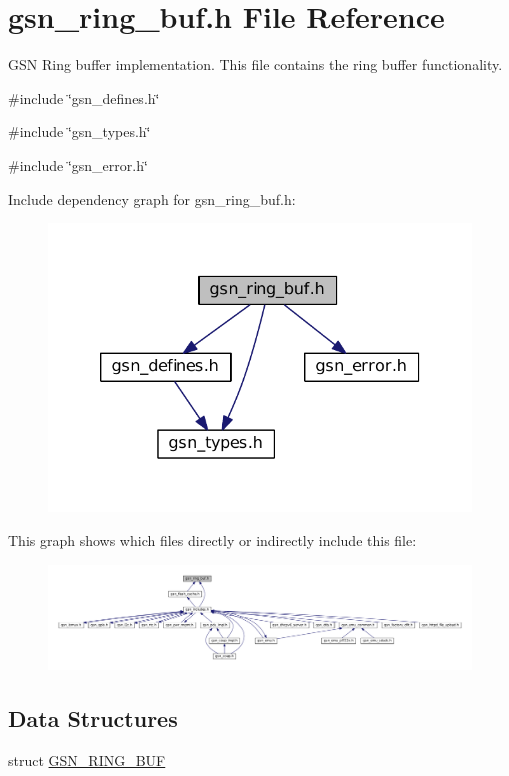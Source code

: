 \hypertarget{a00578}{
\section{gsn\_\-ring\_\-buf.h File Reference}
\label{a00578}
}


GSN Ring buffer implementation. This file contains the ring buffer functionality.  


{\ttfamily \#include \char`\"{}gsn\_\-defines.h\char`\"{}}\par
{\ttfamily \#include \char`\"{}gsn\_\-types.h\char`\"{}}\par
{\ttfamily \#include \char`\"{}gsn\_\-error.h\char`\"{}}\par
Include dependency graph for gsn\_\-ring\_\-buf.h:
\nopagebreak
\begin{figure}[H]
\begin{center}
\leavevmode
\includegraphics[width=320pt]{a00813}
\end{center}
\end{figure}
This graph shows which files directly or indirectly include this file:
\nopagebreak
\begin{figure}[H]
\begin{center}
\leavevmode
\includegraphics[width=400pt]{a00814}
\end{center}
\end{figure}
\subsection*{Data Structures}
\begin{DoxyCompactItemize}
\item 
struct \hyperlink{a00191}{GSN\_\-RING\_\-BUF}
\end{DoxyCompactItemize}
